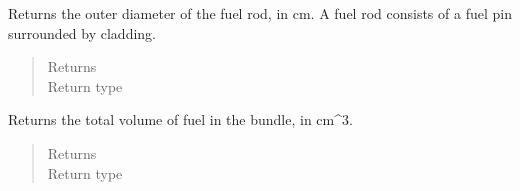 \documentclass[letterpaper,10pt,openany,oneside,english]{sphinxmanual}
\begin{document}
\begin{fulllineitems}
\begin{fulllineitems}
\begin{quote}
\begin{description}
\end{description}\end{quote}

\end{fulllineitems}


\begin{fulllineitems}
\label{\detokenize{support_rst/fuel_bundle:fuel_bundle.FuelBundle.get_fuel_rod_od}}
Returns the outer diameter of the fuel rod, in cm.
A fuel rod consists of a fuel pin surrounded by cladding.
\begin{quote}\begin{description}
\item[{Returns}] \leavevmode
{}

\item[{Return type}] \leavevmode
{}

\end{description}\end{quote}

\end{fulllineitems}


\begin{fulllineitems}
\label{\detokenize{support_rst/fuel_bundle:fuel_bundle.FuelBundle.get_fuel_volume}}
Returns the total volume of fuel in the bundle, in cm\textasciicircum{}3.
\begin{quote}\begin{description}
\item[{Returns}] \leavevmode
{}

\item[{Return type}] \leavevmode
{}

\end{description}\end{quote}

\end{fulllineitems}



\end{fulllineitems}
\end{document}
